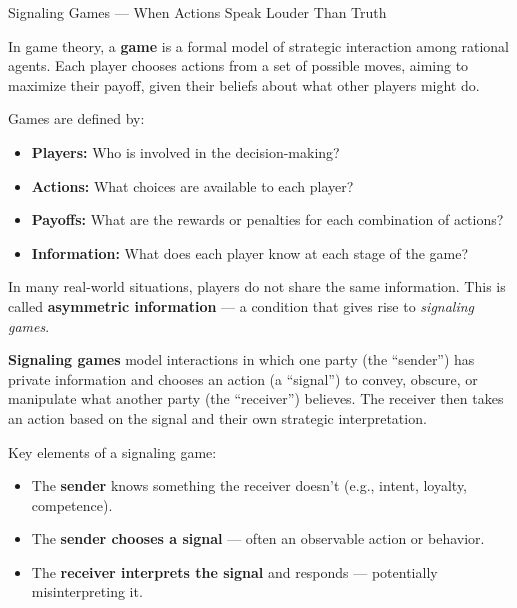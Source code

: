 \begin{TechnicalSidebar}{Signaling Games --- When Actions Speak Louder Than Truth}

    In game theory, a \textbf{game} is a formal model of strategic interaction among rational agents. 
    Each player chooses actions from a set of possible moves, aiming to maximize their payoff, 
    given their beliefs about what other players might do.

    \medskip
    
    Games are defined by:

    \medskip

    \begin{itemize}
      \item \textbf{Players:} Who is involved in the decision-making?
      \item \textbf{Actions:} What choices are available to each player?
      \item \textbf{Payoffs:} What are the rewards or penalties for each combination of actions?
      \item \textbf{Information:} What does each player know at each stage of the game?
    \end{itemize}

    \medskip
    
    In many real-world situations, players do not share the same information. 
    This is called \textbf{asymmetric information} — a condition that gives rise to 
    \emph{signaling games}.
    
    \medskip
    
    \textbf{Signaling games} model interactions in which one party (the ``sender'') has private 
    information and chooses an action (a ``signal'') to convey, obscure, or manipulate what 
    another party (the ``receiver'') believes. The receiver then takes an action based on the 
    signal and their own strategic interpretation.
    
    \medskip
    
    Key elements of a signaling game:

    \medskip

    \begin{itemize}
      \item The \textbf{sender} knows something the receiver doesn't (e.g., intent, loyalty, competence).
      \item The \textbf{sender chooses a signal} — often an observable action or behavior.
      \item The \textbf{receiver interprets the signal} and responds — potentially misinterpreting it.
    \end{itemize}


\end{TechnicalSidebar}
